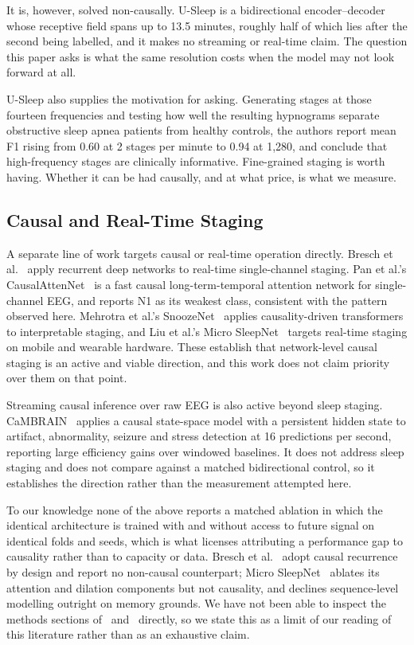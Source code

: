 \documentclass[conference]{IEEEtran}
\begin{document}
It is, however, solved non-causally. U-Sleep is a bidirectional encoder--decoder whose receptive
field spans up to 13.5 minutes, roughly half of which lies after the second being labelled, and it
makes no streaming or real-time claim. The question this paper asks is what the same resolution
costs when the model may not look forward at all.

U-Sleep also supplies the motivation for asking. Generating stages at those fourteen frequencies
and testing how well the resulting hypnograms separate obstructive sleep apnea patients from
healthy controls, the authors report mean F1 rising from 0.60 at 2 stages per minute to 0.94 at
1{,}280, and conclude that high-frequency stages are clinically informative. Fine-grained staging
is worth having. Whether it can be had causally, and at what price, is what we measure.

\subsection{Causal and Real-Time Staging}

A separate line of work targets causal or real-time operation directly. Bresch et
al.~\cite{bresch} apply recurrent deep networks to real-time single-channel staging. Pan et al.'s
CausalAttenNet~\cite{causalattennet} is a fast causal long-term-temporal attention network for
single-channel EEG, and reports N1 as its weakest class, consistent with the pattern observed
here. Mehrotra et al.'s SnoozeNet~\cite{snoozenet} applies causality-driven transformers to
interpretable staging, and Liu et al.'s Micro SleepNet~\cite{microsleepnet} targets real-time
staging on mobile and wearable hardware. These establish that network-level causal staging is an
active and viable direction, and this work does not claim priority over them on that point.

Streaming causal inference over raw EEG is also active beyond sleep staging.
CaMBRAIN~\cite{cambrain} applies a causal state-space model with a persistent hidden state to
artifact, abnormality, seizure and stress detection at 16 predictions per second, reporting large
efficiency gains over windowed baselines. It does not address sleep staging and does not compare
against a matched bidirectional control, so it establishes the direction rather than the
measurement attempted here.

To our knowledge none of the above reports a matched ablation in which the identical architecture
is trained with and without access to future signal on identical folds and seeds, which is what
licenses attributing a performance gap to causality rather than to capacity or data. Bresch et
al.~\cite{bresch} adopt causal recurrence by design and report no non-causal counterpart; Micro
SleepNet~\cite{microsleepnet} ablates its attention and dilation components but not causality, and
declines sequence-level modelling outright on memory grounds. We have not been able to inspect the
methods sections of~\cite{causalattennet} and~\cite{snoozenet} directly, so we state this as a
limit of our reading of this literature rather than as an exhaustive claim.
\end{document}

